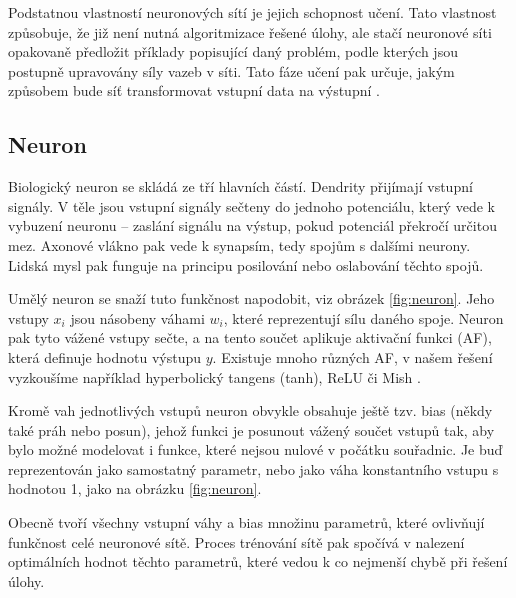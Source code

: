 Podstatnou vlastností neuronových sítí je jejich schopnost učení. Tato
vlastnost způsobuje, že již není nutná algoritmizace řešené úlohy, ale stačí
neuronové síti opakovaně předložit příklady popisující daný problém, podle
kterých jsou postupně upravovány síly vazeb v síti. Tato fáze učení pak určuje,
jakým způsobem bude síť transformovat vstupní data na výstupní
\cite{Vondrak1994}.

\subsection{Neuron}
Biologický neuron se skládá ze tří hlavních částí. Dendrity přijímají vstupní
signály. V těle jsou vstupní signály sečteny do jednoho potenciálu, který vede
k vybuzení neuronu – zaslání signálu na výstup, pokud potenciál překročí
určitou mez. Axonové vlákno pak vede k synapsím, tedy spojům s dalšími neurony.
Lidská mysl pak funguje na principu posilování nebo oslabování těchto spojů.

Umělý neuron se snaží tuto funkčnost napodobit, viz obrázek \ref{fig:neuron}.
Jeho vstupy $x_i$ jsou násobeny váhami $w_i$, které reprezentují sílu daného
spoje. Neuron pak tyto vážené vstupy sečte, a na tento součet aplikuje
aktivační funkci (AF), která definuje hodnotu výstupu $y$. Existuje mnoho
různých AF, v našem řešení vyzkoušíme například hyperbolický tangens (tanh),
ReLU či Mish \cite{afreview}. 

Kromě vah jednotlivých vstupů neuron obvykle obsahuje ještě tzv. bias (někdy
také práh nebo posun), jehož funkci je posunout vážený součet vstupů tak, aby
bylo možné modelovat i funkce, které nejsou nulové v počátku souřadnic. Je buď
reprezentován jako samostatný parametr, nebo jako váha konstantního vstupu s
hodnotou 1, jako na obrázku \ref{fig:neuron}.






Obecně tvoří všechny vstupní váhy a bias množinu parametrů, které ovlivňují
funkčnost celé neuronové sítě. Proces trénování sítě pak spočívá v nalezení
optimálních hodnot těchto parametrů, které vedou k co nejmenší chybě při řešení
úlohy.

